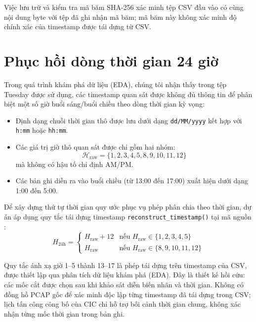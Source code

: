Việc lưu trữ và kiểm tra mã băm SHA-256 xác minh tệp CSV đầu vào có cùng nội dung byte với tệp đã ghi nhận mã băm; mã băm này không xác minh độ chính xác của timestamp được tái dựng từ CSV.

\section{Phục hồi dòng thời gian 24 giờ}

Trong quá trình khám phá dữ liệu (EDA), chúng tôi nhận thấy trong tệp Tuesday được sử dụng, các timestamp quan sát được không đủ thông tin để phân biệt một số giờ buổi sáng/buổi chiều theo dòng thời gian kỳ vọng:
\begin{itemize}
    \item Định dạng chuỗi thời gian thô được lưu dưới dạng \texttt{dd/MM/yyyy} kết hợp với \texttt{h:mm} hoặc \texttt{hh:mm}.
    \item Các giá trị giờ thô quan sát được chỉ gồm hai nhóm:
    \begin{equation}
        \mathcal{H}_{\text{raw}} = \{ 1, 2, 3, 4, 5, 8, 9, 10, 11, 12 \}
    \end{equation}
    mà không có hậu tố chỉ định AM/PM.
    \item Các bản ghi diễn ra vào buổi chiều (từ 13:00 đến 17:00) xuất hiện dưới dạng 1:00 đến 5:00.
\end{itemize}

Để xây dựng thứ tự thời gian quy ước phục vụ phép phân chia theo thời gian, dự án áp dụng quy tắc tái dựng timestamp \texttt{reconstruct\_timestamp()} tại mã nguồn :
\begin{equation}
    H_{\text{24h}} = \begin{cases}
        H_{\text{raw}} + 12 & \text{nếu } H_{\text{raw}} \in \{1, 2, 3, 4, 5\} \\
        H_{\text{raw}} & \text{nếu } H_{\text{raw}} \in \{8, 9, 10, 11, 12\}
    \end{cases}
\end{equation}

Quy tắc ánh xạ giờ 1--5 thành 13--17 là phép tái dựng trên timestamp của CSV, được thiết lập qua phân tích dữ liệu khám phá (EDA). Đây là thiết kế hồi cứu: các mốc cắt được chọn sau khi khảo sát diễn biến nhãn và thời gian. Không có đồng hồ PCAP gốc để xác minh độc lập từng timestamp đã tái dựng trong CSV; lịch tấn công công bố của CIC chỉ hỗ trợ bối cảnh thời gian chung, không xác nhận từng mốc thời gian trong bản ghi.

